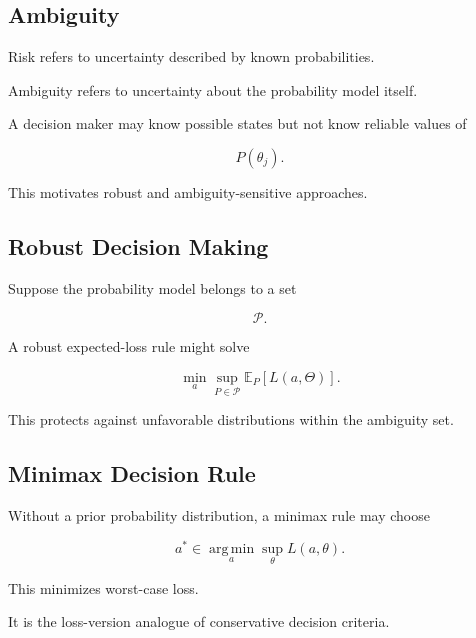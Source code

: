 \subsection{Ambiguity}
\label{subsec:decision-ambiguity}

Risk refers to uncertainty described by known probabilities.

Ambiguity refers to uncertainty about the probability model itself.

A decision maker may know possible states but not know reliable values of

\[
\boxed{
P(\theta_j).
}
\]

This motivates robust and ambiguity-sensitive approaches.

\subsection{Robust Decision Making}
\label{subsec:robust-decision-making}

Suppose the probability model belongs to a set

\[
\mathcal{P}.
\]

A robust expected-loss rule might solve

\[
\boxed{
\min_a
\sup_{P\in\mathcal{P}}
\mathbb{E}_{P}
[
L(a,\Theta)
].
}
\]

This protects against unfavorable distributions within the ambiguity set.

\subsection{Minimax Decision Rule}
\label{subsec:minimax-decision-rule}

Without a prior probability distribution, a minimax rule may choose

\[
\boxed{
a^*
\in
\operatorname*{arg\,min}_a
\sup_{\theta}
L(a,\theta).
}
\]

This minimizes worst-case loss.

It is the loss-version analogue of conservative decision criteria.

